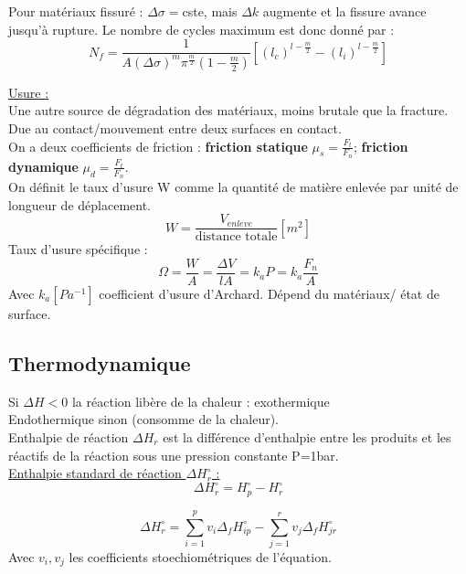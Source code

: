 \documentclass[../main.tex]{subfiles}
\begin{document}
Pour matériaux fissuré : $\Delta \sigma = $cste, mais $\Delta k$ augmente et la fissure avance jusqu'à rupture. Le nombre de cycles maximum est donc donné par :\\
\begin{equation}
    N_f = \frac{1}{A (\Delta \sigma)^m \pi ^{\frac{m}{2}} (1-\frac{m}{2})} [(l_c)^{l-\frac{m}{2}} - (l_i)^{l-\frac{m}{2}}]
\end{equation}

\quad \underline{Usure :}\\
Une autre source de dégradation des matériaux, moins brutale que la fracture. Due au contact/mouvement entre deux surfaces en contact. \\
On a deux coefficients de friction : \textbf{friction statique} $\mu_s = \frac{F_t}{F_n}$; \textbf{friction dynamique} $\mu_d = \frac{F_t}{F_n}$.\\
On définit le taux d'usure W comme la quantité de matière enlevée par unité de longueur de déplacement.\\
\begin{equation}
    W = \frac{V_{enleve}}{\text{distance totale}}[m^2]
\end{equation}
Taux d'usure spécifique : \\
\begin{equation}
    \Omega = \frac{W}{A} = \frac{\Delta V}{lA} = k_a P = k_a \frac{F_n}{A}
\end{equation}
Avec $k_a [Pa^{-1}]$ coefficient d'usure d'Archard. Dépend du matériaux/ état de surface.\\

\subsection{Thermodynamique}
Si $\Delta H < 0$ la réaction libère de la chaleur : exothermique\\
Endothermique sinon (consomme de la chaleur).\\
Enthalpie de réaction $\Delta H_r$ est la différence d'enthalpie entre les produits et les réactifs de la réaction sous une pression constante P=1bar.\\

\quad \underline{Enthalpie standard de réaction $\Delta H_r^{\circ}$ :}\\
\begin{equation}
     \Delta H_r^{\circ} = H^{\circ}_p - H^{\circ}_r
\end{equation}

\begin{equation}
    \Delta H_r^{\circ} = \sum_{i=1}^p v_i \Delta_f H_{ip} ^{\circ} - \sum_{j=1}^r v_j \Delta_f H_{jr} ^{\circ}
\end{equation}
Avec $v_i, v_j$ les coefficients stoechiométriques de l'équation.\\
\end{document}
